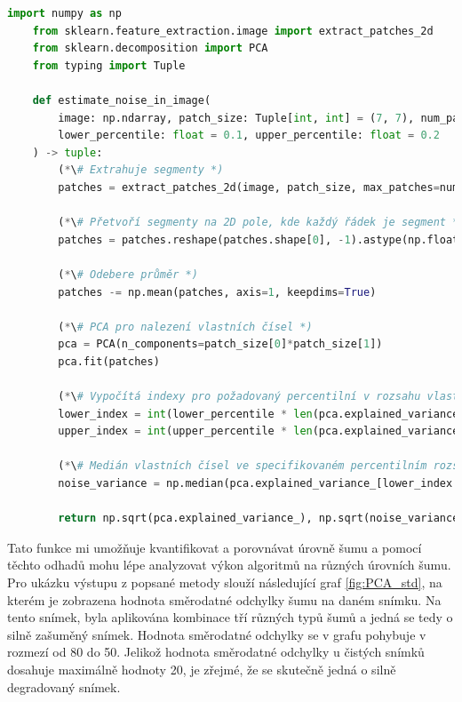\documentclass[male,czech,api_ing]{thesis}
\begin{document}
\begin{lstlisting}[language=Python, caption={Funkce pro odhad směrodatné odchylky šumu ve snímku}, label={lst:noise_estimation}]
    import numpy as np
    from sklearn.feature_extraction.image import extract_patches_2d
    from sklearn.decomposition import PCA
    from typing import Tuple

    def estimate_noise_in_image(
        image: np.ndarray, patch_size: Tuple[int, int] = (7, 7), num_patches: int = 1000,
        lower_percentile: float = 0.1, upper_percentile: float = 0.2
    ) -> tuple:
        (*\# Extrahuje segmenty *)
        patches = extract_patches_2d(image, patch_size, max_patches=num_patches)
        
        (*\# Přetvoří segmenty na 2D pole, kde každý řádek je segment *)
        patches = patches.reshape(patches.shape[0], -1).astype(np.float32)
        
        (*\# Odebere průměr *)
        patches -= np.mean(patches, axis=1, keepdims=True)
        
        (*\# PCA pro nalezení vlastních čísel *)
        pca = PCA(n_components=patch_size[0]*patch_size[1])
        pca.fit(patches)
        
        (*\# Vypočítá indexy pro požadovaný percentilní v rozsahu vlastních čísel *)
        lower_index = int(lower_percentile * len(pca.explained_variance_))
        upper_index = int(upper_percentile * len(pca.explained_variance_))
        
        (*\# Medián vlastních čísel ve specifikovaném percentilním rozsahu *)
        noise_variance = np.median(pca.explained_variance_[lower_index:upper_index])
        
        return np.sqrt(pca.explained_variance_), np.sqrt(noise_variance)
\end{lstlisting}

Tato funkce mi umožňuje kvantifikovat a porovnávat úrovně šumu a pomocí těchto odhadů mohu lépe analyzovat výkon algoritmů na různých úrovních šumu. Pro ukázku výstupu z popsané metody slouží následující graf \ref{fig:PCA_std}, na kterém je zobrazena hodnota směrodatné odchylky šumu na daném snímku. Na tento snímek, byla aplikována kombinace tří různých typů šumů a jedná se tedy o silně zašuměný snímek. Hodnota směrodatné odchylky se v grafu pohybuje v rozmezí od 80 do 50. Jelikož hodnota směrodatné odchylky u čistých snímků dosahuje maximálně hodnoty 20, je zřejmé, že se skutečně jedná o silně degradovaný snímek.
\end{document}
